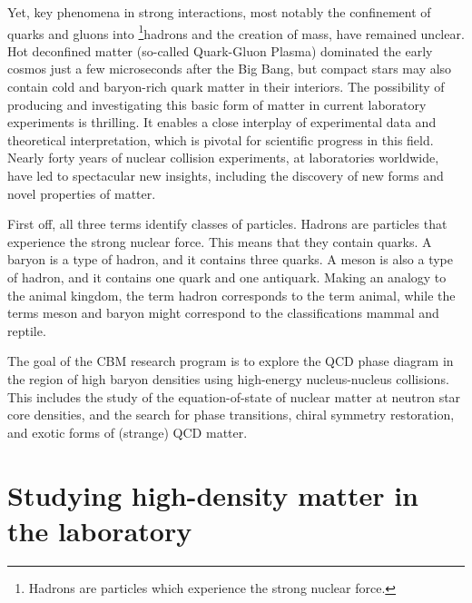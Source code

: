 Yet, key phenomena in strong interactions, most notably the confinement of quarks and gluons into \footnote{Hadrons are particles which experience the strong nuclear force.}{hadrons} and the creation of mass, have remained unclear. Hot deconfined matter (so-called Quark-Gluon Plasma) dominated the early cosmos just a few microseconds after the Big Bang, but compact stars may also contain cold and baryon-rich quark matter in their interiors. The possibility of producing and investigating this basic form of matter in current laboratory experiments is thrilling. It enables a close interplay of experimental data and theoretical interpretation, which is pivotal for scientific progress in this field. Nearly forty years of nuclear collision experiments, at laboratories worldwide, have led to spectacular new insights, including the discovery of new forms and novel properties of matter.


First off, all three terms identify classes of particles. Hadrons are particles that experience the strong nuclear force. This means that they contain quarks. A baryon is a type of hadron, and it contains three quarks. A meson is also a type of hadron, and it contains one quark and one antiquark. Making an analogy to the animal kingdom, the term hadron corresponds to the term animal, while the terms meson and baryon might correspond to the classifications mammal and reptile.
 


 The goal of the CBM research program is to explore the QCD phase diagram in the region of high baryon densities using high-energy nucleus-nucleus collisions. This includes the study of the equation-of-state of nuclear matter at neutron star core densities, and the search for phase transitions, chiral symmetry restoration, and exotic forms of (strange) QCD matter.


\section{Studying high-density matter in the laboratory}


